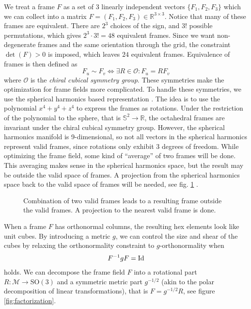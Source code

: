 \documentclass[../thesis.tex]{subfiles}
\begin{document}
We treat a frame $F$ as a set of 3 linearly independent vectors $\{F_1,F_2,F_3 \}$ which we can
collect into a matrix $F=(F_1,F_2,F_3) \in \mathbb{R}^{3\times 3}$.
Notice that many of these frames are equivalent.
There are $2^3$ choices of the sign, and $3!$ possible permutations, which
gives $2^3\cdot 3! = 48$ equivalent frames.
Since we want non-degenerate frames and the same orientation through the grid, the constraint $\det(F)>0$ is imposed,
which leaves $24$ equivalent frames.
Equivalence of frames is then defined as
$$F_u \sim F_v \iff \exists R \in \mathcal{O} : F_u=RF_v$$
where $\mathcal{O}$ is the \emph{chiral cubical symmetry group}\cite{Nieser}.
These symmetries make the optimization for frame fields more complicated.
To handle these symmetries, we use the spherical harmonics based representation \cite{Huang}.
The idea is to use the polynomial $x^4+y^4+z^4$ to express the frames as rotations.
Under the restriction of the polynomial to the sphere, that is $\mathbb{S}^2\to \mathbb{R}$, the octahedral frames
are invariant under the chiral cubical symmetry group. However, the spherical harmonics
manifold is 9-dimensional, so not all vectors in the spherical harmonics represent valid frames,
since rotations only exhibit 3 degrees of freedom.
While optimizing the frame field, some kind of ``average'' of two frames will be done.
This averaging makes sense in the spherical harmonics space, but the result may be outside the valid
space of frames. A projection from the spherical
harmonics space back to the valid space of frames will be needed, see fig. \ref{fig:projection} \cite{Ray}.
\begin{figure}[htb]
  \centering
  \def\svgwidth{20em}
  
  \caption{Combination of two valid frames leads to a resulting frame outside the valid frames. A projection to the nearest valid frame is done.}
  \label{fig:projection}
\end{figure}


When a frame $F$ has orthonormal columns, the resulting hex elements look like unit cubes.
By introducing a metric $g$, we can control the size and shear of the cubes by
relaxing the orthonormality constraint to $g$-orthonormality when
$$F^{-1}gF = \operatorname{Id}$$
holds. We can decompose the frame field $F$ into a rotational part $R : \mathcal{M} \to \text{SO}(3)$ and a symmetric metric part $g^{-1/2}$
(akin to the polar decomposition of linear transformations)\cite{Panozzo}, that is $F = g^{-1/2}R$,
see figure \ref{fig:factorization}.
\end{document}

